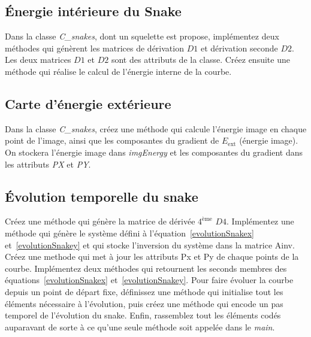 \documentclass[10pt,a4paper]{article}
\begin{document}
\subsection{\'{E}nergie int\'{e}rieure du Snake}
Dans la classe \textit{C\_snakes}, dont un squelette est propose, impl\'{e}mentez deux m\'{e}thodes qui g\'{e}n\`{e}rent les matrices de d\'{e}rivation $D1$ et d\'{e}rivation seconde $D2$. Les deux matrices $D1$ et $D2$ sont des attributs de la classe. Cr\'{e}ez ensuite une m\'{e}thode qui r\'{e}alise le calcul de l'\'{e}nergie interne de la courbe.

\subsection{Carte d'\'{e}nergie ext\'{e}rieure}
Dans la classe \textit{C\_snakes}, cr\'{e}ez une m\'{e}thode qui calcule l'\'{e}nergie image en chaque point de l'image, ainsi que les composantes du gradient de $E_{\text{ext}}$ (\'{e}nergie image). On stockera l'\'{e}nergie image dans \textit{imgEnergy} et les composantes du gradient dans les attributs \textit{PX} et \textit{PY}.


\subsection{\'{E}volution temporelle du snake}
Cr\'{e}ez une m\'{e}thode qui g\'{e}n\`{e}re la matrice de d\'{e}riv\'{e}e $4^{\text{\`eme}}$ $D4$. Impl\'{e}mentez une m\'{e}thode qui g\'{e}n\`{e}re le syst\`{e}me d\'{e}fini \`{a} l'\'{e}quation~\eqref{evolutionSnakex} et~\eqref{evolutionSnakey}  et qui stocke l'inversion du syst\`{e}me dans la matrice Ainv. Cr\'{e}ez une methode qui met \`{a} jour les attributs Px et Py de chaque points de la courbe. Impl\'{e}mentez deux m\'{e}thodes qui retournent les seconds membres des \'{e}quations~\eqref{evolutionSnakex} et~\eqref{evolutionSnakey}. Pour faire \'{e}voluer la courbe depuis un point de d\'{e}part fixe, d\'{e}finissez une m\'{e}thode qui initialise tout les \'{e}l\'{e}ments n\'{e}cessaire \`{a} l'\'{e}volution, puis cr\'{e}ez une m\'{e}thode qui encode un pas temporel de l'\'{e}volution du snake. Enfin, rassemblez tout les \'{e}l\'{e}ments cod\'{e}s auparavant de sorte \`{a} ce qu'une seule m\'{e}thode soit appel\'{e}e dans le \textit{main}. 
\end{document}
